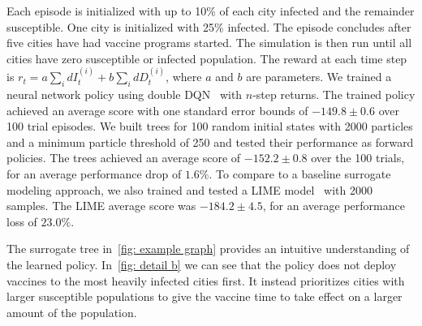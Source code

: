 \documentclass[letterpaper]{article} %
\begin{document}
Each episode is initialized with up to 10\% of each city infected and the remainder susceptible.
One city is initialized with 25\% infected.
The episode concludes after five cities have had vaccine programs started.
The simulation is then run until all cities have zero susceptible or infected population.
The reward at each time step is $ r_t = a \sum_i dI^{(i)}_t + b \sum_i dD^{(i)}_t $, where $a$ and $b$ are parameters.  We trained a neural network policy using double DQN~\cite{hasselt2010} with $n$-step returns.
The trained policy achieved an average score with one standard error bounds of $-149.8 \pm 0.6$ over 100 trial episodes.
We built trees for 100 random initial states with 2000 particles and a minimum particle threshold of 250 and tested their performance as forward policies.
The trees achieved an average score of $-152.2 \pm 0.8$ over the 100 trials, for an average performance drop of $1.6 \%$.
To compare to a baseline surrogate modeling approach, we also trained and tested a LIME model~\cite{ribeiro2016} with 2000 samples.
The LIME average score was $-184.2 \pm 4.5$, for an average performance loss of $23.0 \%$.

The surrogate tree in~\cref{fig: example graph} provides an intuitive understanding of the learned policy.
In~\cref{fig: detail b} we can see that the policy does not deploy vaccines to the most heavily infected cities first.
It instead prioritizes cities with larger susceptible populations to give the vaccine time to take effect on a larger amount of the population.
\vspace{-1.44mm}
\end{document}
